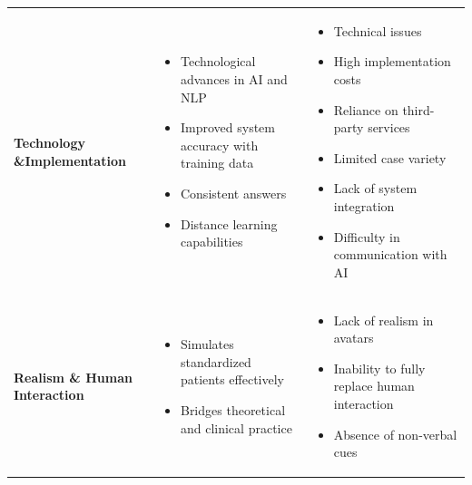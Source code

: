 \begin{table}[htbp]
\begin{tabular}{%
       >{\centering\arraybackslash}m{}%
       >{\raggedright\arraybackslash}m{}%
       >{\raggedright\arraybackslash}m{}%
   }
       \textbf{Technology \&\newline Implementation} &
       \begin{itemize}[leftmargin=*, topsep=2pt, itemsep=2pt, parsep=0pt]
           \item Technological advances in AI and NLP \cite{furlan_natural_2021,maicher_artificial_2023,wang_intelligent_2022}
           \item Improved system accuracy with training data \cite{maicher_artificial_2023}
           \item Consistent answers \cite{co_using_2022}
           \item Distance learning capabilities \cite{co_using_2022,furlan_natural_2021,wang_intelligent_2022}
       \end{itemize}
       &
       \begin{itemize}[leftmargin=*, topsep=2pt, itemsep=2pt, parsep=0pt]
           \item Technical issues \cite{shorey_virtual_2019,anthamatten_integrating_2024,de_mattei_are_2024}
           \item High implementation costs \cite{de_mattei_are_2024}
           \item Reliance on third-party services \cite{lippitsch_development_2024}
           \item Limited case variety \cite{wang_artificial_2025}
           \item Lack of system integration \cite{wang_artificial_2025}
           \item Difficulty in communication with AI \cite{anthamatten_integrating_2024}
       \end{itemize}
       \\

       \textbf{Realism \& Human Interaction} &
       \begin{itemize}[leftmargin=*, topsep=2pt, itemsep=2pt, parsep=0pt]
           \item Simulates standardized patients effectively \cite{wang_application_2025}
           \item Bridges theoretical and clinical practice \cite{de_mattei_are_2024}
       \end{itemize}
       &
       \begin{itemize}[leftmargin=*, topsep=2pt, itemsep=2pt, parsep=0pt]
           \item Lack of realism in avatars \cite{de_mattei_are_2024}
           \item Inability to fully replace human interaction \cite{de_mattei_are_2024}
           \item Absence of non-verbal cues \cite{brugge_large_2024}
       \end{itemize}
       \\


\end{tabular}
\end{table}
